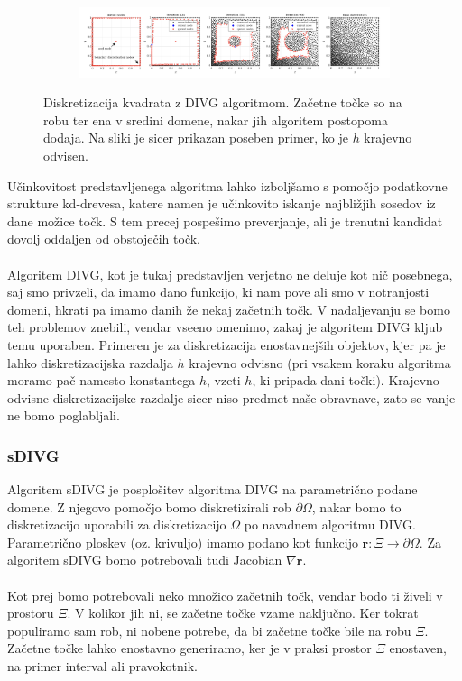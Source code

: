 \documentclass{article}
\begin{document}
\begin{figure}[H]
\centering
\begin{subfigure}{.8\textwidth}
\includegraphics[width=\linewidth]{Slike/divg.png}
\end{subfigure}
\caption{Diskretizacija kvadrata z DIVG algoritmom. Začetne točke so na robu ter ena v sredini domene, nakar jih algoritem postopoma dodaja. Na sliki je sicer prikazan poseben primer, ko je $h$ krajevno odvisen.}
\label{fig:divg}
\end{figure}
Učinkovitost predstavljenega algoritma lahko izboljšamo s pomočjo podatkovne strukture kd-drevesa, katere namen je učinkovito iskanje najbližjih sosedov iz dane možice točk. S tem precej pospešimo preverjanje, ali je trenutni kandidat dovolj oddaljen od obstoječih točk.
\\
\\
Algoritem DIVG, kot je tukaj predstavljen verjetno ne deluje kot nič posebnega, saj smo privzeli, da imamo dano funkcijo, ki nam pove ali smo v notranjosti domeni, hkrati pa imamo danih že nekaj začetnih točk. V nadaljevanju se bomo teh problemov znebili, vendar vseeno omenimo, zakaj je algoritem DIVG kljub temu uporaben. Primeren je za diskretizacija enostavnejših objektov, kjer pa je lahko diskretizacijska razdalja $h$ krajevno odvisno (pri vsakem koraku algoritma moramo pač namesto konstantega $h$, vzeti $h$, ki pripada dani točki). Krajevno odvisne diskretizacijske razdalje sicer niso predmet naše obravnave, zato se vanje ne bomo poglabljali.

\subsubsection{sDIVG}
Algoritem sDIVG \cite{sdivg} je posplošitev algoritma DIVG na parametrično podane domene. Z njegovo pomočjo bomo diskretizirali rob $\partial \Omega$, nakar bomo to diskretizacijo uporabili za diskretizacijo $\Omega$ po navadnem algoritmu DIVG. Parametrično ploskev (oz. krivuljo) imamo podano kot funkcijo $\textbf{r}: \Xi \to \partial \Omega$. Za algoritem sDIVG bomo potrebovali tudi Jacobian $\nabla \textbf{r}$.
\\
\\
Kot prej bomo potrebovali neko množico začetnih točk, vendar bodo ti živeli v prostoru $\Xi$. V kolikor jih ni, se začetne točke vzame naključno. Ker tokrat populiramo sam rob, ni nobene potrebe, da bi začetne točke bile na robu $\Xi$. Začetne točke lahko enostavno generiramo, ker je v praksi prostor $\Xi$ enostaven, na primer interval ali pravokotnik. 
\end{document}
